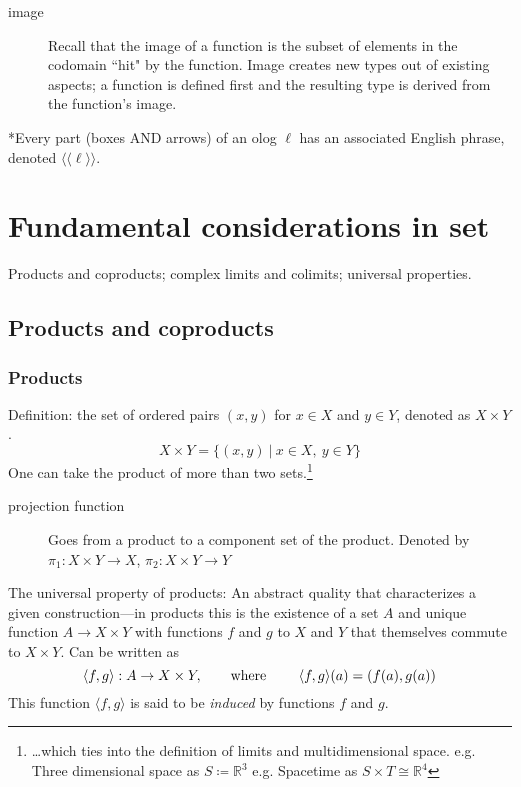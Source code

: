 \documentclass{article}
\begin{document}
\begin{description}
\item[image] Recall that the image of a function is the subset of elements in the codomain ``hit" by the function. Image creates new types out of existing aspects; a function is defined first and the resulting type is derived from the function's image.

\end{description}

*Every part (boxes AND arrows) of an olog $\ell$ has an associated English phrase, denoted $\langle\langle \ell \rangle \rangle$.

\section{Fundamental considerations in set}
Products and coproducts; complex limits and colimits; universal properties.
\subsection{Products and coproducts}
\subsubsection{Products}
Definition: the set of ordered pairs $(x,y)$ for $x \in X$ and $y \in Y$, denoted as $X \times Y$. 
\begin{equation*}
X \times Y = \{ (x,y)\ |\ x \in X,\ y \in Y \}
\end{equation*}
One can take the product of more than two sets.\footnote{\ldots which ties into the definition of limits and multidimensional space.
e.g. Three dimensional space as $S \coloneqq \mathbb{R}^{3}$ 
e.g. Spacetime as $S \times T \cong \mathbb{R}^{4}$}

\begin{description}
\item[projection function] Goes from a product to a component set of the product. Denoted by $\pi_{1}: X \times Y \rightarrow X$, $\pi_{2}: X \times Y \rightarrow Y$

\end{description}
The universal property of products: An abstract quality that characterizes a given construction---in products this is the existence of a set $A$ and unique function $A \rightarrow X \times Y$ with functions $f$ and $g$ to $X$ and $Y$ that themselves commute to $X \times Y$. Can be written as
\begin{equation*}
\langle f,g \rangle: A \rightarrow X \times Y, \text{\qquad where \qquad} \langle f,g \rangle(a) = (f(a),g(a))
\end{equation*} 
This function $\langle f,g \rangle$ is said to be \emph{induced} by functions $f$ and $g$. 
\end{document}
